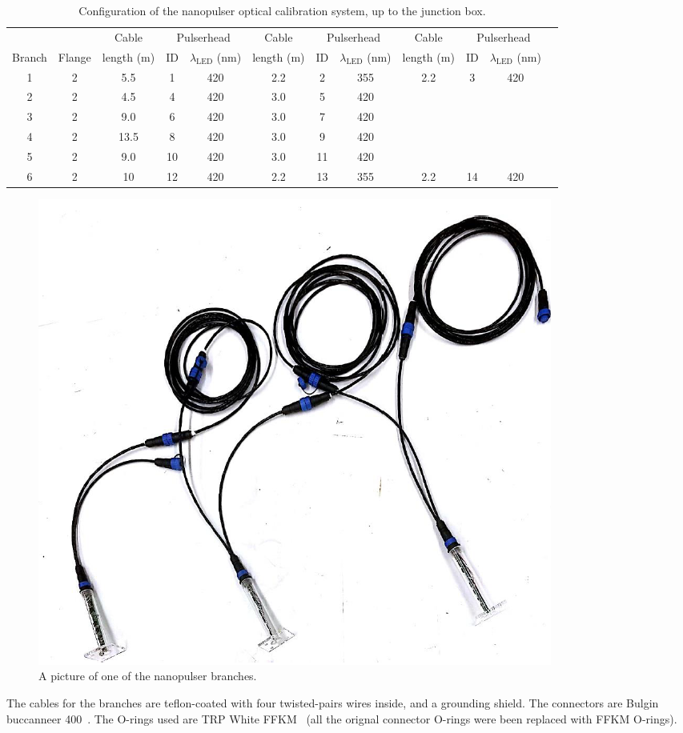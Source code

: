 \begin{table}[h!]
  \begin{center}
    \caption{Configuration of the \jsns nanopulser optical calibration system, up to the junction box.}
    \label{table:cable_configuration}
    \begin{tabular}{|c|c|c|c|c|c|c|c|c|c|c|c} 
	\hline
	 &  & Cable  & \multicolumn{2}{c|}{Pulserhead} &  Cable & \multicolumn{2}{c|}{Pulserhead} &  Cable & \multicolumn{2}{c|}{Pulserhead}\\ \cline{4-5} \cline{7-8} \cline{10-11}
	Branch & Flange & length (m) &  ID & $\lambda_{\mathrm{LED}}$ (nm) & length (m) &  ID & $\lambda_{\mathrm{LED}}$ (nm) & length (m) &  ID & $\lambda_{\mathrm{LED}}$ (nm) \\ \hline
	1 & 2 & 5.5   &  1 & 420 & 2.2 & 2 & 355 & 2.2 & 3 & 420 \\ 
	2 & 2 & 4.5   &  4 & 420 & 3.0 & 5 & 420 & & & \\ 
	3 & 2 & 9.0   &  6 & 420 & 3.0 & 7 & 420 & & & \\ 
	4 & 2 & 13.5 &  8 & 420 & 3.0 & 9 & 420 & & & \\ 
	5 & 2 & 9.0   & 10 & 420 & 3.0 & 11 & 420 & & & \\ 
	6 & 2 & 10    & 12 & 420 & 2.2 & 13 & 355 & 2.2 & 14 & 420 \\
	\hline
    \end{tabular}
  \end{center}
\end{table}

\begin{figure}
\begin{center}	
  \includegraphics[width=0.5\linewidth]{figures/branch.png}
  \caption{A picture of one of the \jsns nanopulser branches.}
  \label{figure:branch}
\end{center}
\end{figure}

The cables for the branches are teflon-coated with four twisted-pairs wires inside, and a grounding shield. The connectors are Bulgin buccanneer 400~\cite{BULGIN}. The O-rings used are TRP White FFKM~\cite{TRP} (all the orignal connector O-rings were been replaced with FFKM O-rings). 

